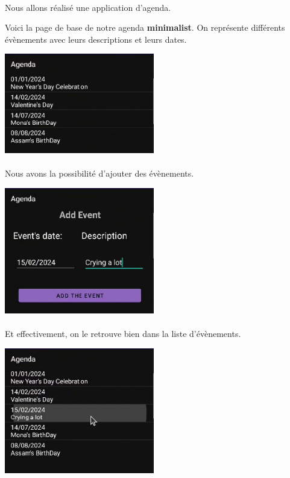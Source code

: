 \documentclass[a4paper]{article}
\begin{document}
\begin{multicols}{2}
    \paragraph{}
      Nous allons réalisé une application d'agenda.


      Voici la page de base de notre agenda \textbf{minimalist}. On représente différents évènements avec leurs descriptions et leurs dates. 

      \noindent\includegraphics[width=0.49\textwidth]{agenda/before}

    \paragraph{}
      Nous avons la possibilité d'ajouter des évènements.
      
      \noindent\includegraphics[width=0.49\textwidth]{agenda/add}

    \paragraph{}
      Et effectivement, on le retrouve bien dans la liste d'évènements.

      \noindent\includegraphics[width=0.49\textwidth]{agenda/after}


\end{multicols}
\end{document}
